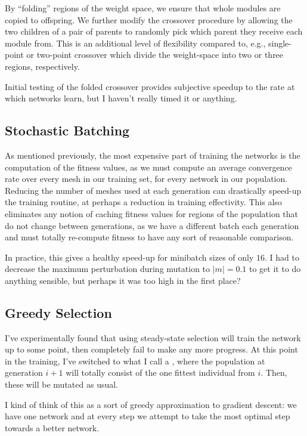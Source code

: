\documentclass{article}
\newcommand{\abs}[1]{\left\lvert#1\right\rvert}
\begin{document}
By ``folding'' regions of the weight space, we ensure that whole modules are copied to offspring.  We further modify the crossover procedure by allowing the two children of a pair of parents to randomly pick which parent they receive each module from.  This is an additional level of flexibility compared to, e.g., single-point or two-point crossover which divide the weight-space into two or three regions, respectively.

Initial testing of the folded crossover provides subjective speedup to the rate at which networks learn, but I haven't really timed it or anything.

\subsection{Stochastic Batching}
As mentioned previously, the most expensive part of training the networks is the computation of the fitness values, as we must compute an average convergence rate over every mesh in our training set, for every network in our population.  Reducing the number of meshes used at each generation can drastically speed-up the training routine, at perhaps a reduction in training effectivity.  This also eliminates any notion of caching fitness values for regions of the population that do not change between generations, as we have a different batch each generation and must totally re-compute fitness to have any sort of reasonable comparison.

In practice, this gives a healthy speed-up for minibatch sizes of only $16$.  I had to decrease the maximum perturbation during mutation to $\abs{m}=0.1$ to get it to do anything sensible, but perhaps it was too high in the first place?

\subsection{Greedy Selection}
I've experimentally found that using steady-state selection will train the network up to some point, then completely fail to make any more progress.  At this point in the training, I've switched to what I call a , where the population at generation $i+1$ will totally consist of the one fittest individual from $i$.  Then, these will be mutated as usual.

I kind of think of this as a sort of greedy approximation to gradient descent: we have one network and at every step we attempt to take the most optimal step towards a better network.
\end{document}
